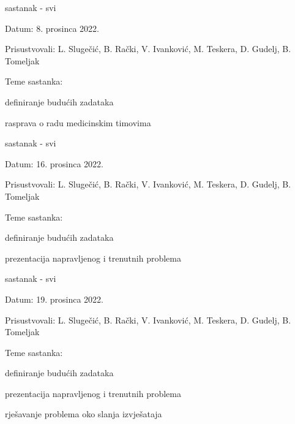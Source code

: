 \begin{packed_enum}
\begin{packed_item}
\begin{packed_item}
				\end{packed_item}
			\end{packed_item}
			
			\item  sastanak - svi
			\item[] \begin{packed_item}
				\item Datum: 8. prosinca 2022.
				\item Prisustvovali: 
                L. Slugečić, B. Rački, V. Ivanković, M. Teskera, D. Gudelj, B. Tomeljak
				\item Teme sastanka:
				\begin{packed_item}
					\item 
                    definiranje budućih zadataka
                    \item
                    rasprava o radu medicinskim timovima
                    
				
				\end{packed_item}
			\end{packed_item}
			
			\item  sastanak - svi
			\item[] \begin{packed_item}
				\item Datum: 16. prosinca 2022.
				\item Prisustvovali: 
                L. Slugečić, B. Rački, V. Ivanković, M. Teskera, D. Gudelj, B. Tomeljak
				\item Teme sastanka:
				\begin{packed_item}
					\item 
                    definiranje budućih zadataka
                    \item
                    prezentacija napravljenog i trenutnih problema
                    
				
				\end{packed_item}
			\end{packed_item}
			
			\item  sastanak - svi
			\item[] \begin{packed_item}
				\item Datum: 19. prosinca 2022.
				\item Prisustvovali: 
                L. Slugečić, B. Rački, V. Ivanković, M. Teskera, D. Gudelj, B. Tomeljak
				\item Teme sastanka:
				\begin{packed_item}
					\item 
                    definiranje budućih zadataka
                    \item
                    prezentacija napravljenog i trenutnih problema
                    \item
                    rješavanje problema oko slanja izvješataja
				

\end{packed_item}
\end{packed_item}
\end{packed_enum}
